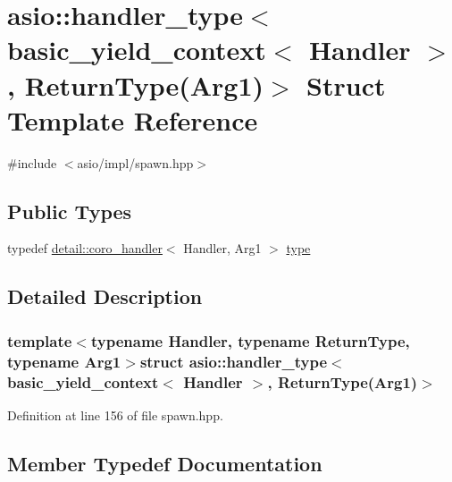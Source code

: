 \hypertarget{structasio_1_1handler__type_3_01basic__yield__context_3_01_handler_01_4_00_01_return_type_07_arg1_08_4}{}\section{asio\+:\+:handler\+\_\+type$<$ basic\+\_\+yield\+\_\+context$<$ Handler $>$, Return\+Type(Arg1)$>$ Struct Template Reference}
\label{structasio_1_1handler__type_3_01basic__yield__context_3_01_handler_01_4_00_01_return_type_07_arg1_08_4}


{\ttfamily \#include $<$asio/impl/spawn.\+hpp$>$}

\subsection*{Public Types}
\begin{DoxyCompactItemize}
\item 
typedef \hyperlink{classasio_1_1detail_1_1coro__handler}{detail\+::coro\+\_\+handler}$<$ Handler, Arg1 $>$ \hyperlink{structasio_1_1handler__type_3_01basic__yield__context_3_01_handler_01_4_00_01_return_type_07_arg1_08_4_a9c6d3bd9f6e0cbc667f5c8faa12328cc}{type}
\end{DoxyCompactItemize}


\subsection{Detailed Description}
\subsubsection*{template$<$typename Handler, typename Return\+Type, typename Arg1$>$struct asio\+::handler\+\_\+type$<$ basic\+\_\+yield\+\_\+context$<$ Handler $>$, Return\+Type(\+Arg1)$>$}



Definition at line 156 of file spawn.\+hpp.



\subsection{Member Typedef Documentation}
\hypertarget{structasio_1_1handler__type_3_01basic__yield__context_3_01_handler_01_4_00_01_return_type_07_arg1_08_4_a9c6d3bd9f6e0cbc667f5c8faa12328cc}{}
